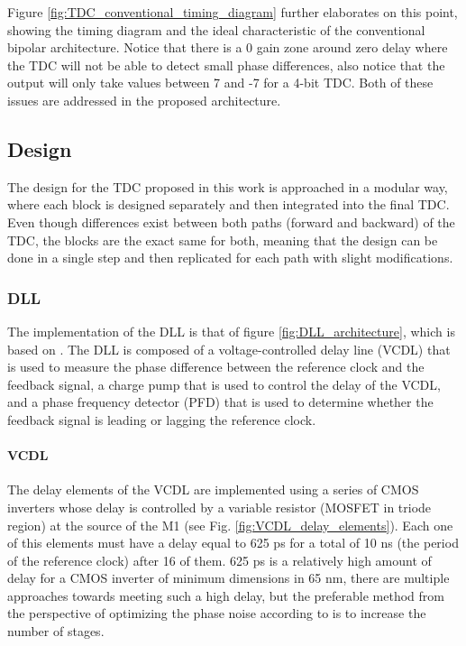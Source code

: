 Figure \ref{fig:TDC_conventional_timing_diagram} further elaborates on this point, showing the timing diagram and the ideal characteristic of the conventional bipolar architecture. Notice that there 
is a 0 gain zone around zero delay where the TDC will not be able to detect small phase differences, also notice that the output will only take values between 7 and -7 for a 4-bit TDC. Both of
these issues are addressed in the proposed architecture.

\subsection{Design}
The design for the TDC proposed in this work is approached in a modular way, where each block is designed separately and then integrated into the final TDC. Even though differences exist between
both paths (forward and backward) of the TDC, the blocks are the exact same for both, meaning that the design can be done in a single step and then replicated for each path with
slight modifications.

\subsubsection{DLL}
The implementation of the DLL is that of figure \ref{fig:DLL_architecture}, which is based on \cite{Razavi_DLL_article}. The DLL is composed of a voltage-controlled delay line (VCDL) that is used
to measure the phase difference between the reference clock and the feedback signal, a charge pump that is used to control the delay of the VCDL, and a phase frequency detector (PFD) that is used to
determine whether the feedback signal is leading or lagging the reference clock.

\paragraph{VCDL}
The delay elements of the VCDL are implemented using a series of CMOS inverters whose delay is controlled by a variable resistor (MOSFET in triode region) at the source of the M1 (see Fig. \ref{fig:VCDL_delay_elements}).
Each one of this elements must have a delay equal to 625 ps for a total of 10 ns (the period of the reference clock) after 16 of them. 625 ps is a relatively high amount of delay for a CMOS inverter of
minimum dimensions in 65 nm, there are multiple approaches towards meeting such a high delay, but the preferable method from the perspective of optimizing the phase noise according to \cite{Razavi_PLL_book}
is to increase the number of stages.

